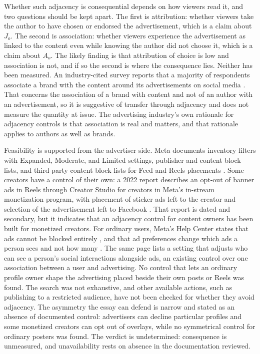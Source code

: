 Whether such adjacency is consequential depends on how viewers read it, and two questions should be kept apart. The first is attribution: whether viewers take the author to have chosen or endorsed the advertisement, which is a claim about $J_o$. The second is association: whether viewers experience the advertisement as linked to the content even while knowing the author did not choose it, which is a claim about $A_o$. The likely finding is that attribution of choice is low and association is not, and if so the second is where the consequence lies. Neither has been measured. An industry-cited survey reports that a majority of respondents associate a brand with the content around its advertisements on social media \cite{peer39}. That concerns the association of a brand with content and not of an author with an advertisement, so it is suggestive of transfer through adjacency and does not measure the quantity at issue. The advertising industry's own rationale for adjacency controls is that association is real and matters, and that rationale applies to authors as well as brands.

Feasibility is supported from the advertiser side. Meta documents inventory filters with Expanded, Moderate, and Limited settings, publisher and content block lists, and third-party content block lists for Feed and Reels placements \cite{meta-brand}. Some creators have a control of their own: a 2022 report describes an opt-out of banner ads in Reels through Creator Studio for creators in Meta's in-stream monetization program, with placement of sticker ads left to the creator and selection of the advertisement left to Facebook \cite{sej-overlay}. That report is dated and secondary, but it indicates that an adjacency control for content owners has been built for monetized creators. For ordinary users, Meta's Help Center states that ads cannot be blocked entirely \cite{fb-block-ads}, and that ad preferences change which ads a person sees and not how many \cite{fb-ad-prefs}. The same page lists a setting that adjusts who can see a person's social interactions alongside ads, an existing control over one association between a user and advertising. No control that lets an ordinary profile owner shape the advertising placed beside their own posts or Reels was found. The search was not exhaustive, and other available actions, such as publishing to a restricted audience, have not been checked for whether they avoid adjacency. The asymmetry the essay can defend is narrow and stated as an absence of documented control: advertisers can decline particular profiles and some monetized creators can opt out of overlays, while no symmetrical control for ordinary posters was found. The verdict is undetermined: consequence is unmeasured, and unavailability rests on absence in the documentation reviewed.

